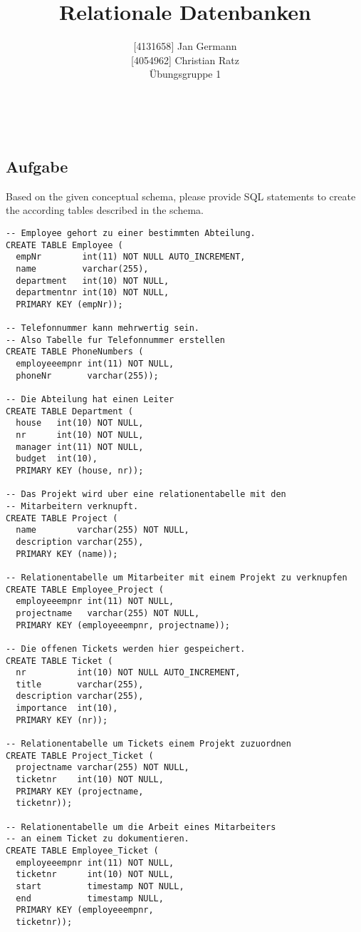 \documentclass[11pt,a4paper,DIV=9]{scrartcl}
\author{{[}4131658{]} Jan Germann \\{[}4054962{]} Christian Ratz\\Übungsgruppe 1}
\title{Relationale Datenbanken}
\newcounter{temp}
\newcommand{\aufgabe}[1]{
  \setcounter{temp}{\value{subsection}}
  \setcounter{subsection}{#1}
  \addtocounter{subsection}{-1}
  \subsection{Aufgabe}
  \setcounter{subsection}{\value{temp}}
}
\renewcommand{\author}[1]{\renewcommand{\author}{#1}}
\renewcommand{\title}[1]{\renewcommand{\title}{#1}}
\newcommand{\makehomeworktitle}{
  \begin{minipage}[t]{6.5cm}
    \sf{\author}
  \end{minipage}
  \begin{minipage}[t]{6.5cm}
    \begin{flushright}
      \sf{\title\\\today}
    \end{flushright}
  \end{minipage}
  \\[0.2cm]
  \begin{center}
    \sf{
      \color{blue}{
        \LARGE{Aufgabenblatt \blattnr}
      }
    }
  \end{center}
  \vspace{0.1cm}
}
\begin{document}
\makehomeworktitle
   \aufgabe{1}
   Based on the given conceptual schema, please provide SQL statements to create the according tables described in the schema.
\begin{lstlisting}
-- Employee gehort zu einer bestimmten Abteilung.
CREATE TABLE Employee (
  empNr        int(11) NOT NULL AUTO_INCREMENT, 
  name         varchar(255), 
  department   int(10) NOT NULL, 
  departmentnr int(10) NOT NULL, 
  PRIMARY KEY (empNr));

-- Telefonnummer kann mehrwertig sein. 
-- Also Tabelle fur Telefonnummer erstellen
CREATE TABLE PhoneNumbers (
  employeeempnr int(11) NOT NULL, 
  phoneNr       varchar(255));

-- Die Abteilung hat einen Leiter
CREATE TABLE Department (
  house   int(10) NOT NULL, 
  nr      int(10) NOT NULL, 
  manager int(11) NOT NULL, 
  budget  int(10), 
  PRIMARY KEY (house, nr));

-- Das Projekt wird uber eine relationentabelle mit den
-- Mitarbeitern verknupft.
CREATE TABLE Project (
  name        varchar(255) NOT NULL, 
  description varchar(255), 
  PRIMARY KEY (name));

-- Relationentabelle um Mitarbeiter mit einem Projekt zu verknupfen
CREATE TABLE Employee_Project (
  employeeempnr int(11) NOT NULL, 
  projectname   varchar(255) NOT NULL, 
  PRIMARY KEY (employeeempnr, projectname));

-- Die offenen Tickets werden hier gespeichert.
CREATE TABLE Ticket (
  nr          int(10) NOT NULL AUTO_INCREMENT, 
  title       varchar(255), 
  description varchar(255), 
  importance  int(10), 
  PRIMARY KEY (nr));

-- Relationentabelle um Tickets einem Projekt zuzuordnen
CREATE TABLE Project_Ticket (
  projectname varchar(255) NOT NULL, 
  ticketnr    int(10) NOT NULL, 
  PRIMARY KEY (projectname, 
  ticketnr));

-- Relationentabelle um die Arbeit eines Mitarbeiters
-- an einem Ticket zu dokumentieren.
CREATE TABLE Employee_Ticket (
  employeeempnr int(11) NOT NULL, 
  ticketnr      int(10) NOT NULL, 
  start         timestamp NOT NULL, 
  end           timestamp NULL, 
  PRIMARY KEY (employeeempnr, 
  ticketnr));


\end{lstlisting}
\end{document}
